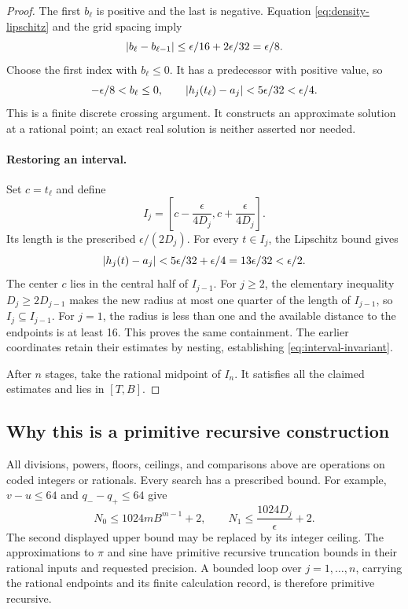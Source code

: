 \begin{proof}
The first $b_\ell$ is positive and the last is negative. Equation
\eqref{eq:density-lipschitz} and the grid spacing imply
\[
 \left|b_\ell-b_{\ell-1}\right|
 \le\epsilon/16+2\epsilon/32=\epsilon/8.
\]
Choose the first index with $b_\ell\le0$. It has a predecessor with
positive value, so
\[
 -\epsilon/8<b_\ell\le0,
 \qquad
 \left|h_j(t_\ell)-a_j\right|<5\epsilon/32<\epsilon/4.
\]
This is a finite discrete crossing argument. It constructs an approximate
solution at a rational point; an exact real solution is neither asserted
nor needed.

\paragraph{Restoring an interval.}
Set $c=t_\ell$ and define
\[
 I_j=\left[c-\frac\epsilon{4D_j},
           c+\frac\epsilon{4D_j}\right].
\]
Its length is the prescribed $\epsilon/(2D_j)$. For every $t\in I_j$,
the Lipschitz bound gives
\[
 \left|h_j(t)-a_j\right|
 <5\epsilon/32+\epsilon/4
 =13\epsilon/32<\epsilon/2.
\]
The center $c$ lies in the central half of $I_{j-1}$. For $j\ge2$,
the elementary inequality $D_j\ge2D_{j-1}$ makes the new radius at most
one quarter of the length of $I_{j-1}$, so $I_j\subseteq I_{j-1}$.
For $j=1$, the radius is less than one and the available distance to the
endpoints is at least 16. This proves the same containment. The earlier
coordinates retain their estimates by nesting, establishing
\eqref{eq:interval-invariant}.

After $n$ stages, take the rational midpoint of $I_n$. It satisfies all the
claimed estimates and lies in $[T,B]$.
\end{proof}

\subsection{Why this is a primitive recursive construction}

All divisions, powers, floors, ceilings, and comparisons above are operations
on coded integers or rationals. Every search has a prescribed bound. For
example, $v-u\le64$ and $q_--q_+\le64$ give
\[
 N_0\le1024mB^{m-1}+2,
 \qquad
 N_1\le\frac{1024D_j}{\epsilon}+2.
\]
The second displayed upper bound may be replaced by its integer ceiling.
The approximations to $\pi$ and sine have primitive recursive truncation
bounds in their rational inputs and requested precision. A bounded loop over
$j=1,\ldots,n$, carrying the rational endpoints and its finite calculation
record, is therefore primitive recursive.

